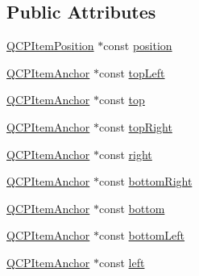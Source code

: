 \subsection*{Public Attributes}
\begin{DoxyCompactItemize}
\item 
\hyperlink{class_q_c_p_item_position}{Q\+C\+P\+Item\+Position} $\ast$const \hyperlink{class_q_c_p_item_text_a0d228a00e819022b5690c65762721129}{position}
\item 
\hyperlink{class_q_c_p_item_anchor}{Q\+C\+P\+Item\+Anchor} $\ast$const \hyperlink{class_q_c_p_item_text_a6354d8762182a3502103fabe5fbb8512}{top\+Left}
\item 
\hyperlink{class_q_c_p_item_anchor}{Q\+C\+P\+Item\+Anchor} $\ast$const \hyperlink{class_q_c_p_item_text_a5c87ee162cbbe3d166b97826c8849304}{top}
\item 
\hyperlink{class_q_c_p_item_anchor}{Q\+C\+P\+Item\+Anchor} $\ast$const \hyperlink{class_q_c_p_item_text_ad18ac45cb4cc135de1eb78f2e86b6504}{top\+Right}
\item 
\hyperlink{class_q_c_p_item_anchor}{Q\+C\+P\+Item\+Anchor} $\ast$const \hyperlink{class_q_c_p_item_text_aef159622ce6502412e782a21ba6d84f2}{right}
\item 
\hyperlink{class_q_c_p_item_anchor}{Q\+C\+P\+Item\+Anchor} $\ast$const \hyperlink{class_q_c_p_item_text_a8ad47045c29af43b0312f7d93bb74374}{bottom\+Right}
\item 
\hyperlink{class_q_c_p_item_anchor}{Q\+C\+P\+Item\+Anchor} $\ast$const \hyperlink{class_q_c_p_item_text_a94aeec080f877d3d1d0c3d8ffc10e9e6}{bottom}
\item 
\hyperlink{class_q_c_p_item_anchor}{Q\+C\+P\+Item\+Anchor} $\ast$const \hyperlink{class_q_c_p_item_text_a6a1c872ad3789ecafcaeac2066e218a0}{bottom\+Left}
\item 
\hyperlink{class_q_c_p_item_anchor}{Q\+C\+P\+Item\+Anchor} $\ast$const \hyperlink{class_q_c_p_item_text_ab8c6c6e1df36256986fab1463c0a1d38}{left}
\end{DoxyCompactItemize}
